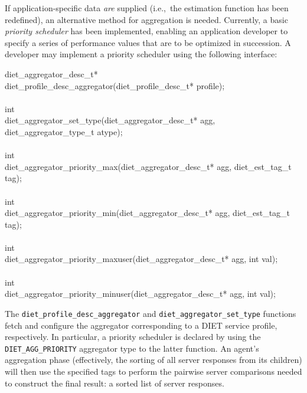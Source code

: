 If application-specific data \emph{are} supplied (i.e.,~the
estimation function has been redefined), an alternative method for
aggregation is needed.  Currently, a basic
\emph{priority scheduler} has been implemented, enabling an
application developer to specify a series of performance values that
are to be optimized in succession.  A developer may implement a
priority scheduler using the following interface:
\begin{code}
diet\_aggregator\_desc\_t* \\
diet\_profile\_desc\_aggregator(diet\_profile\_desc\_t* profile); \\
\\
int \\
diet\_aggregator\_set\_type(diet\_aggregator\_desc\_t* agg, diet\_aggregator\_type\_t atype); \\
\\
int \\
diet\_aggregator\_priority\_max(diet\_aggregator\_desc\_t* agg, diet\_est\_tag\_t tag); \\
\\
int \\
diet\_aggregator\_priority\_min(diet\_aggregator\_desc\_t* agg, diet\_est\_tag\_t tag); \\
\\
int \\
diet\_aggregator\_priority\_maxuser(diet\_aggregator\_desc\_t* agg, int val); \\
\\
int \\
diet\_aggregator\_priority\_minuser(diet\_aggregator\_desc\_t* agg, int val); \\
\end{code}
The \texttt{diet\_profile\_desc\_aggregator} and
\texttt{diet\_aggregator\_set\_type} functions fetch and configure the
aggregator corresponding to a DIET service profile, respectively.
In particular, a priority scheduler is declared by using the
\texttt{DIET\_AGG\_PRIORITY} aggregator type to the latter function.
An agent's aggregation phase (effectively, the sorting of all server
responses from its children) will then use the specified tags to
perform the pairwise server comparisons needed to construct the final
result: a sorted list of server responses.

